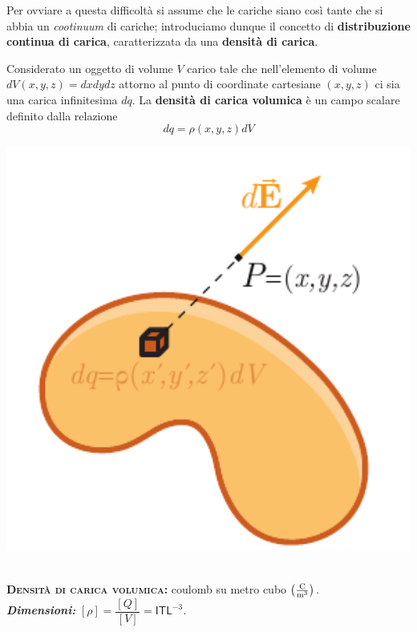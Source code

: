 Per ovviare a questa difficoltà si assume che le cariche siano così tante che si abbia un \textit{cootinuum} di cariche; introduciamo dunque il concetto di \textbf{distribuzione continua di carica}, caratterizzata da una \textbf{densità di carica}.
\begin{define}
\begin{minipage}{0.65\textwidth}
Considerato un oggetto di volume $V$ carico tale che nell'elemento di volume $dV(x,y,z)=dxdydz$ attorno al punto di coordinate cartesiane $(x,y,z)$ ci sia una carica infinitesima $dq$. La \textbf{densità di carica volumica} è un campo scalare definito dalla relazione
	\begin{equation}
		dq=\rho(x,y,z)dV
	\end{equation}
\end{minipage}\hspace{10pt}
\begin{minipage}{0.34\textwidth}
	\begin{center}
		\includegraphics[width=1\textwidth]{images/chp1density.pdf}
	\end{center}
\end{minipage}
\end{define}
\begin{units}~\\
	\textbf{\textsc{Densità di carica volumica:}} coulomb su metro cubo $\left(\unit[per-mode = fraction]{\coulomb\per\cubic\meter}\right)$.\\
	\textit{\textbf{Dimensioni:}} $[\rho]=\dfrac{[Q]}{[V]}=\mathsf{I}\mathsf{T}\mathsf{L}^{-3}$.
\end{units}
